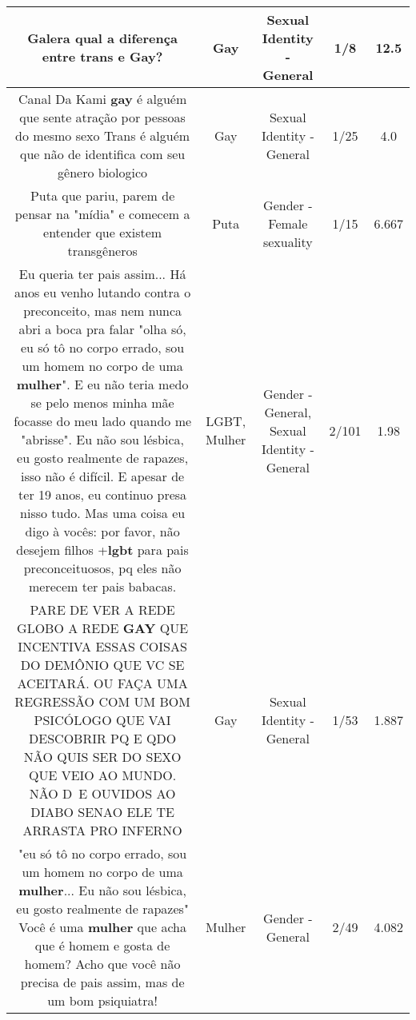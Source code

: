 \documentclass[11pt]{article}
\newlength\mylength
\begin{document}
\begin{center}
\begin{longtable}{|C{.65\mylength}|C{.30\mylength}|C{.12\mylength}|C{.12\mylength}|C{.12\mylength}|}
  \small Galera qual a diferença entre trans e \textbf{Gay}?\normalsize   & Gay & Sexual Identity - General & 1/8 & 12.5 \\  \hline
  \small Canal Da Kami \textbf{gay} é alguém que sente atração por pessoas do mesmo sexo Trans é alguém que não de identifica com seu gênero biologico\normalsize   & Gay & Sexual Identity - General & 1/25 & 4.0 \\  \hline
  \small Puta que pariu, parem de pensar na "mídia" e comecem a entender que existem transgêneros\normalsize   & Puta & Gender - Female sexuality & 1/15 & 6.667 \\  \hline
  \small Eu queria ter pais assim... Há anos eu venho lutando contra o preconceito, mas nem nunca abri a boca pra falar "olha só, eu só tô no corpo errado, sou um homem no corpo de uma \textbf{mulher}". E eu não teria medo se pelo menos minha mãe focasse do meu lado quando me "abrisse". Eu não sou lésbica, eu gosto realmente de rapazes, isso não é difícil. E apesar de ter 19 anos, eu continuo presa nisso tudo. Mas uma coisa eu digo à vocês: por favor, não desejem filhos +\textbf{lgbt} para pais preconceituosos, pq eles não merecem ter pais babacas.\normalsize   & LGBT, Mulher & Gender - General, Sexual Identity - General & 2/101 & 1.98 \\  \hline
  \small PARE DE VER A REDE GLOBO A REDE \textbf{GAY} QUE INCENTIVA ESSAS COISAS DO DEMÔNIO QUE VC SE ACEITARÁ. OU FAÇA UMA REGRESSÃO COM UM BOM PSICÓLOGO QUE VAI DESCOBRIR PQ E QDO NÃO QUIS SER DO SEXO QUE VEIO AO MUNDO. NÃO D~E OUVIDOS AO DIABO SENAO ELE TE ARRASTA PRO INFERNO\normalsize   & Gay & Sexual Identity - General & 1/53 & 1.887 \\  \hline
  \small "eu só tô no corpo errado, sou um homem no corpo de uma \textbf{mulher}... Eu não sou lésbica, eu gosto realmente de rapazes" Você é uma \textbf{mulher} que acha que é homem e gosta de homem? Acho que você não precisa de pais assim, mas de um bom psiquiatra!\normalsize   & Mulher & Gender - General & 2/49 & 4.082 \\  \hline

\end{longtable}
\end{center}
\end{document}

